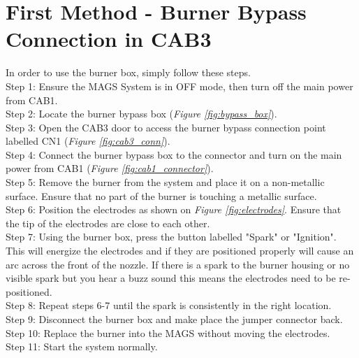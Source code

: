 \section{First Method - Burner Bypass Connection in CAB3}
In order to use the burner box, simply follow these steps.\\

Step 1: Ensure the MAGS System is in OFF mode, then turn off the main power from CAB1.\\

Step 2: Locate the burner bypass box (\emph{Figure \ref{fig:bypass_box}}).\\

Step 3: Open the CAB3 door to access the burner bypass connection point labelled CN1 (\emph{Figure \ref{fig:cab3_conn}}).\\

Step 4: Connect the burner bypass box to the connector and turn on the main power from CAB1 (\emph{Figure \ref{fig:cab1_connector}}).\\

Step 5: Remove the burner from the system and place it on a non-metallic surface. Ensure that no part of the burner is touching a metallic surface.\\

Step 6: Position the electrodes as shown on \emph{Figure \ref{fig:electrodes}}. Ensure that the tip of the electrodes are close to each other.\\

Step 7: Using the burner box, press the button labelled "Spark" or "Ignition". This will energize the electrodes and if they are positioned properly will cause an arc across the front of the nozzle. If there is a spark to the burner housing or no visible spark but you hear a buzz sound this means the electrodes need to be re-positioned.\\

Step 8: Repeat steps 6-7 until the spark is consistently in the right location.\\

Step 9: Disconnect the burner box and make place the jumper connector back.\\

Step 10: Replace the burner into the MAGS without moving the electrodes.\\

Step 11: Start the system normally.